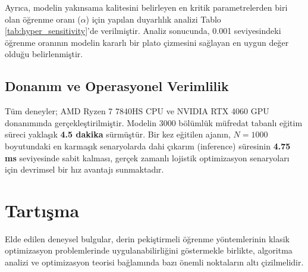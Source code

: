 \documentclass[conference]{IEEEtran}
\begin{document}
Ayrıca, modelin yakınsama kalitesini belirleyen en kritik parametrelerden biri olan öğrenme oranı ($\alpha$) için yapılan duyarlılık analizi Tablo \ref{tab:hyper_sensitivity}'de verilmiştir. Analiz sonucunda, 0.001 seviyesindeki öğrenme oranının modelin kararlı bir plato çizmesini sağlayan en uygun değer olduğu belirlenmiştir.

\begin{table}[H]
\centering
\caption{Öğrenme Oranı ($\alpha$) Duyarlılık Analizi ($N=50$)}
\label{tab:hyper_sensitivity}
\end{table}

\subsection{Donanım ve Operasyonel Verimlilik}
Tüm deneyler; AMD Ryzen 7 7840HS CPU ve NVIDIA RTX 4060 GPU donanımında gerçekleştirilmiştir. Modelin 3000 bölümlük müfredat tabanlı eğitim süreci yaklaşık \textbf{4.5 dakika} sürmüştür. Bir kez eğitilen ajanın, $N=1000$ boyutundaki en karmaşık senaryolarda dahi çıkarım (inference) süresinin \textbf{4.75 ms} seviyesinde sabit kalması, gerçek zamanlı lojistik optimizasyon senaryoları için devrimsel bir hız avantajı sunmaktadır.

\section{Tartışma}
\label{sec:tartisma}
Elde edilen deneysel bulgular, derin pekiştirmeli öğrenme yöntemlerinin klasik optimizasyon problemlerinde uygulanabilirliğini göstermekle birlikte, algoritma analizi ve optimizasyon teorisi bağlamında bazı önemli noktaların altı çizilmelidir.
\end{document}
